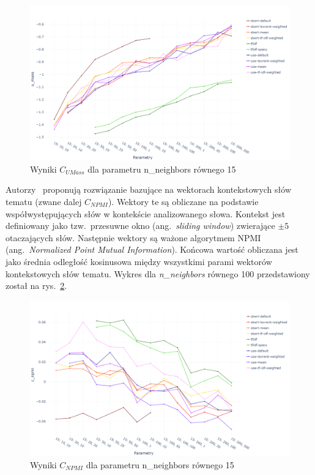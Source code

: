 	\begin{figure}[htb]
		\centering
		\includegraphics[width=\linewidth]{rys05/c_umass.png}
		\caption{Wyniki \(C_{UMass}\) dla parametru n\_neighbors równego 15}\label{fig:umass_score}
	\end{figure}

	Autorzy~\cite{C_NPMI} proponują rozwiązanie bazujące na wektorach kontekstowych słów tematu (zwane dalej \(C_{NPMI}\)).
	Wektory te są obliczane na podstawie współwystępujących słów w kontekście analizowanego słowa.
	Kontekst jest definiowany jako tzw.\ przesuwne okno (ang.\ \emph{sliding window}) zwierające \(\pm 5\) otaczających słów.
	Następnie wektory są ważone algorytmem NPMI (ang.\ \emph{Normalized Point Mutual Information}).
	Końcowa wartość obliczana jest jako średnia odległość kosinusowa między wszystkimi parami wektorów kontekstowych słów tematu.
	Wykres dla \emph{n\_neighbors} równego 100 przedstawiony został na rys.~\ref{fig:npmi_score}.

	\begin{figure}[htb]
		\centering
		\includegraphics[width=\linewidth]{rys05/c_npmi.png}
		\caption{Wyniki \(C_{NPMI}\) dla parametru n\_neighbors równego 15}\label{fig:npmi_score}
	\end{figure}

